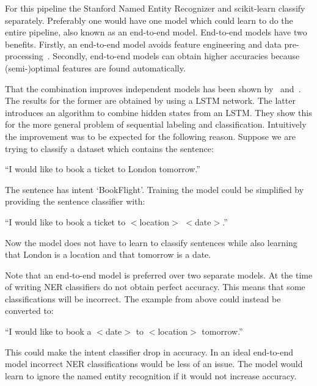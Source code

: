For this pipeline the Stanford Named Entity Recognizer and scikit-learn classify separately.
Preferably one would have one model which could learn to do the entire pipeline, also known as an end-to-end model.
End-to-end models have two benefits.
Firstly, an end-to-end model avoids feature engineering and data pre-processing~\citep{ma2016end}.
Secondly, end-to-end models can obtain higher accuracies because (semi-)optimal features are found automatically.

That the combination improves independent models has been shown by~\citet{ma2017jointly} and~\citet{zhang2018joint}.
The results for the former are obtained by using a LSTM network.
The latter introduces an algorithm to combine hidden states from an LSTM.
They show this for the more general problem of sequential labeling and classification.
Intuitively the improvement was to be expected for the following reason.
Suppose we are trying to classify a dataset which contains the sentence:

\begin{center}
    ``I would like to book a ticket to London tomorrow.''
\end{center}

The sentence has intent `BookFlight'.
Training the model could be simplified by providing the sentence classifier with:

\begin{center}
    ``I would like to book a ticket to $<$location$>$ $<$date$>$.''
\end{center}

Now the model does not have to learn to classify sentences while also learning that London is a location and that tomorrow is a date.

Note that an end-to-end model is preferred over two separate models.
At the time of writing NER classifiers do not obtain perfect accuracy.
This means that some classifications will be incorrect.
The example from above could instead be converted to:

\begin{center}
    ``I would like to book a $<$date$>$ to $<$location$>$ tomorrow.''
\end{center}

This could make the intent classifier drop in accuracy.
In an ideal end-to-end model incorrect NER classifications would be less of an issue.
The model would learn to ignore the named entity recognition if it would not increase accuracy.

